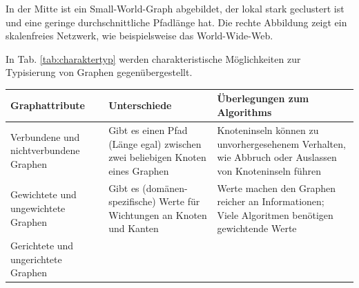 \documentclass[ngerman,]{scrreprt}
\begin{document}
In der Mitte ist ein Small-World-Graph abgebildet, der lokal stark geclustert ist und eine geringe durchschnittliche Pfadlänge hat. Die rechte Abbildung zeigt ein skalenfreies Netzwerk, wie beispielsweise das World-Wide-Web.

In Tab. \ref{tab:charaktertyp} werden charakteristische Möglichkeiten zur Typisierung von Graphen gegenübergestellt.

\begin{longtable}[]{@{}lll@{}}
\toprule
\begin{minipage}[b]{0.22\columnwidth}\raggedright
Graphattribute\strut
\end{minipage} & \begin{minipage}[b]{0.26\columnwidth}\raggedright
Unterschiede\strut
\end{minipage} & \begin{minipage}[b]{0.44\columnwidth}\raggedright
Überlegungen zum Algorithms\strut
\end{minipage}\tabularnewline
\midrule
\endhead
\begin{minipage}[t]{0.22\columnwidth}\raggedright
Verbundene und nichtverbundene Graphen\strut
\end{minipage} & \begin{minipage}[t]{0.26\columnwidth}\raggedright
Gibt es einen Pfad (Länge egal) zwischen zwei beliebigen Knoten eines Graphen\strut
\end{minipage} & \begin{minipage}[t]{0.44\columnwidth}\raggedright
Knoteninseln können zu unvorhergesehenem Verhalten, wie Abbruch oder Auslassen von Knoteninseln führen\strut
\end{minipage}\tabularnewline
\begin{minipage}[t]{0.22\columnwidth}\raggedright
Gewichtete und ungewichtete Graphen\strut
\end{minipage} & \begin{minipage}[t]{0.26\columnwidth}\raggedright
Gibt es (domänen-spezifische) Werte für Wichtungen an Knoten und Kanten\strut
\end{minipage} & \begin{minipage}[t]{0.44\columnwidth}\raggedright
Werte machen den Graphen reicher an Informationen; Viele Algoritmen benötigen gewichtende Werte\strut
\end{minipage}\tabularnewline
\begin{minipage}[t]{0.22\columnwidth}\raggedright
Gerichtete und ungerichtete Graphen\strut
\end{minipage} & \begin{minipage}[t]{0.26\columnwidth}\raggedright

\end{minipage}
\end{longtable}
\end{document}
